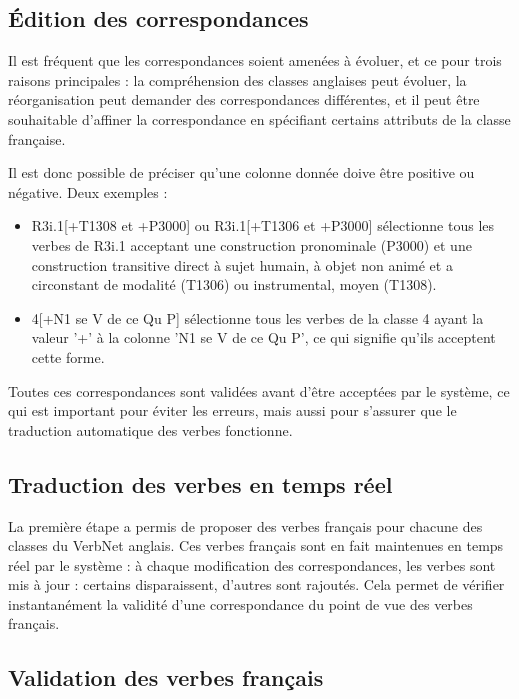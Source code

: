 \subsection{Édition des correspondances}

Il est fréquent que les correspondances soient amenées à évoluer, et ce pour
trois raisons principales : la compréhension des classes anglaises peut
évoluer, la réorganisation peut demander des correspondances différentes, et il
peut être souhaitable d'affiner la correspondance en spécifiant certains
attributs de la classe française.

Il est donc possible de préciser qu'une colonne donnée doive être positive ou
négative. Deux exemples :
\begin{itemize}
    \item R3i.1[+T1308 et +P3000] ou R3i.1[+T1306 et +P3000] sélectionne tous
        les verbes de R3i.1 acceptant une construction pronominale (P3000) et
        une construction transitive direct à sujet humain, à objet non animé
        et a circonstant de modalité (T1306) ou instrumental, moyen (T1308).
    \item 4[+N1 se V de ce Qu P] sélectionne tous les verbes de la classe 
        4 ayant la valeur '+' à la colonne 'N1 se V de ce Qu P', ce qui
        signifie qu'ils acceptent cette forme.
\end{itemize}

Toutes ces correspondances sont validées avant d'être acceptées par le système,
ce qui est important pour éviter les erreurs, mais aussi pour s'assurer que le
traduction automatique des verbes fonctionne.

\subsection{Traduction des verbes en temps réel}

La première étape a permis de proposer des verbes français pour chacune des
classes du VerbNet anglais. Ces verbes français sont en fait maintenues en
temps réel par le système : à chaque modification des correspondances, les
verbes sont mis à jour : certains disparaissent, d'autres sont rajoutés. Cela
permet de vérifier instantanément la validité d'une correspondance du point de
vue des verbes français.

\subsection{Validation des verbes français}


